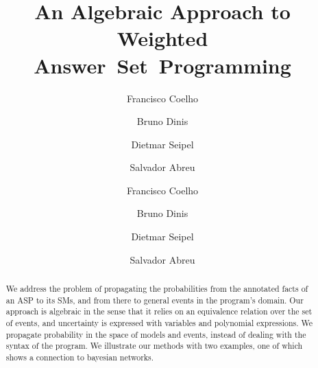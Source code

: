 \documentclass[a4paper]{article}
\renewcommand{\cite}{\citep}
\newcommand{\spa}[1]{{\color{brown!80!black}{#1}}}
\begin{document}

\title{%
    An Algebraic Approach to Weighted
    Answer~Set~Programming
}
\ifTLP

  \begin{authgrp}
    \author{ }

    \author{ }

    \author{ }

    \author{ }
  \end{authgrp}
\else
\ifARTICLE
\author{%
    Francisco Coelho   \and %
    Bruno Dinis        \and %
    Dietmar Seipel     \and %
    Salvador Abreu     %
}
\else
\author{%
    Francisco Coelho   \and %
    Bruno Dinis        \and %
    Dietmar Seipel       \and %
    Salvador Abreu     %
}
\fi
\fi

\maketitle

\begin{abstract}
  We address the problem of propagating the probabilities from the \spa{more, more!}
  annotated facts of an \acl{ASP} to its \aclp{SM}, and from there to
  general events in the program's domain.
  Our approach is algebraic in the sense that it relies on an
  equivalence relation over the set of events, and uncertainty is
  expressed with variables and polynomial expressions.
  We propagate probability in the space of models and events, instead
  of dealing with the syntax of the program.
  We illustrate our methods with two examples, one of which shows a
  connection to bayesian networks.
\end{abstract}
\end{document}
